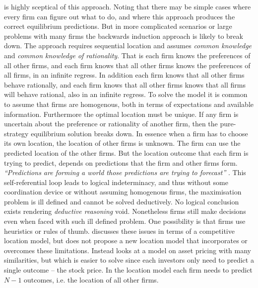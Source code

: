 \documentclass[preprint, 12pt]{elsarticle}
\begin{document}
\citet[chapter~11]{Arthur_2014} is highly sceptical of this approach. Noting that there may be simple cases where every firm can figure out what to do, and where this approach produces the correct equilibrium predictions. But in more complicated scenarios or large problems with many firms the backwards induction approach is likely to break down. The approach requires sequential location and assumes \emph{common knowledge} and \emph{common knowledge of rationality}. That is each firm knows the preferences of all other firms, and each firm knows that all other firms knows the preferences of all firms, in an infinite regress. In addition each firm knows that all other firms behave rationally, and each firm knows that all other firms knows that all firms will behave rational, also in an infinite regress. To solve the model it is common to assume that firms are homogenous, both in terms of expectations and available information. Furthermore the optimal location must be unique. If any firm is uncertain about the preference or rationality of another firm, then the pure-strategy equilibrium solution breaks down. In essence when a firm has to choose its own location, the location of other firms is unknown. The firm can use the predicted location of the other firms. But the location outcome that each firm is trying to predict, depends on predictions that the firm and other firms form. \emph{``Predictions are forming a world those predictions are trying to forecast''} \citep[p.~175]{Arthur_2014}. This self-referential loop leads to logical indeterminacy, and thus without some coordination device or without assuming homogenous firms, the maximisation problem is ill defined and cannot be solved deductively. No logical conclusion exists rendering \emph{deductive reasoning} void. Nonetheless firms still make decisions even when faced with such ill defined problem. One possibility is that firms use heuristics or rules of thumb. \citet[chapter~11]{Arthur_2014} discusses these issues in terms of a competitive location model, but does not propose a new location model that incorporates or overcomes these limitations. Instead \citet[chapter~11]{Arthur_2014} looks at a model on asset pricing with many similarities, but which is easier to solve since each investors only need to predict a single outcome -- the stock price. In the location model each firm needs to predict $N-1$ outcomes, i.e. the location of all other firms. 
\end{document}
